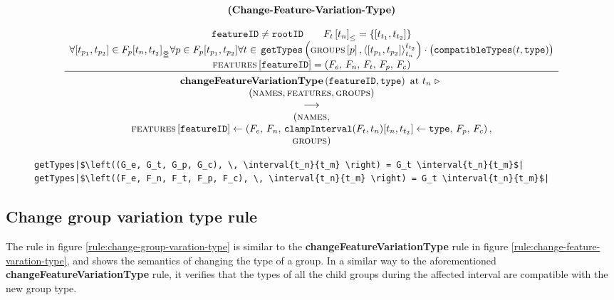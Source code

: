 \begin{figure}
    \renewcommand{\arraystretch}{1.1}
    \sossize$$\begin{array}{c}
      \ntyperule{Change-Feature-Variation-Type}
      {\\
        \var{featureID} \neq \var{rootID} \qquad
        \containing{F_t}{t_n} = \set{\interval{t_{t_1}}{t_{t_2}}} %
        \\
        \forall \interval{t_{p_1}}{t_{p_2}} \in \overlapping{F_p}{t_n}{t_{t_2}} %
        \forall p \in F_p \interval{t_{p_1}}{t_{p_2}} %
        \forall t \in \, \var{getTypes}\left(\lookup{\groups}{p}, \clamp{\interval{t_{p_1}}{t_{p_2}}}{t_n}{t_{t_2}}\right)
        \cdot \big(\var{compatibleTypes}(t, \var{type})\big)\\
        \lookup{\features{}}{\var{featureID}} = \left( F_e,\, F_n,\, F_t,\, F_p,\, F_c \right)
      }
      {
        \textbf{changeFeatureVariationType}\left( \var{featureID}, \var{type}\right) \text{ at } t_n \shove \\
        (\names{}, \features{}, \groups{}) \\
        \transition \\
        (\names{}, \\
        \lookup{\features{}}{\var{featureID}} \assign \left( F_e,\, F_n,\, 
        \var{clampInterval}(F_t, t_n)\interval{t_n}{t_{t_2}} \assign \var{type},\, F_p,\, F_c \right),
        \\ \groups{})
      }
    \end{array}$$
  \caption{\label{rule:change-feature-varation-type}}
\end{figure}

\begin{figure}
  \begin{verbatim}
getTypes|$\left((G_e, G_t, G_p, G_c), \, \interval{t_n}{t_m} \right) = G_t \interval{t_n}{t_m}$|
getTypes|$\left((F_e, F_n, F_t, F_p, F_c), \, \interval{t_n}{t_m} \right) = G_t \interval{t_n}{t_m}$|
  \end{verbatim}
  \caption{\label{get-types}}
\end{figure}

\subsection{Change group variation type rule}
\label{sub:change-group-variation-type-rule}
The rule in figure \vref{rule:change-group-varation-type} is similar to the \textbf{changeFeatureVariationType} rule in figure \vref{rule:change-feature-varation-type}, and shows the semantics of changing the type of a group. In a similar way to the aforementioned \textbf{changeFeatureVariationType} rule, it verifies that the types of all the child groups during the affected interval are compatible with the new group type.

